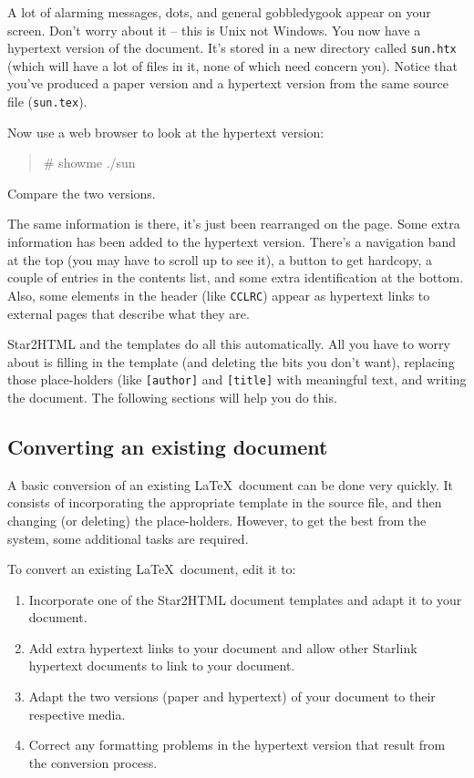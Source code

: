 \documentclass[twoside,11pt,nolof]{starlink}
\begin{document}
A lot of alarming messages, dots, and general gobbledygook appear on your
screen.
Don't worry about it -- this is Unix not Windows.
You now have a hypertext version of the document.
It's stored in a new directory called \texttt{sun.htx} (which will
have a lot of files in it, none of which need concern you).
Notice that you've produced a paper version and a hypertext version from the
same source file (\texttt{sun.tex}).

Now use a web browser to look at the hypertext version:

\begin{quote}
\begin{terminalv}
# showme ./sun
\end{terminalv}
\end{quote}

Compare the two versions.

The same information is there, it's just been rearranged on the page.
Some extra information has been added to the hypertext version.
There's a navigation band at the top (you may have to scroll up to see it), a
button to get hardcopy, a couple of entries in the contents list, and some
extra identification at the bottom.
Also, some elements in the header (like \texttt{CCLRC}) appear as hypertext
links to external pages that describe what they are.

Star2HTML and the templates do all this automatically.
All you have to worry about is filling in the template (and deleting the
bits you don't want), replacing those place-holders (like \texttt{[author]} and
\texttt{[title]} with meaningful text, and writing the document.
The following sections will help you do this.

\subsection{Converting an existing document}

A basic conversion of an existing \LaTeX\ document can be done very quickly.
It consists of incorporating the appropriate template in the source file, and
then changing (or deleting) the place-holders. However, to get the best from
the system, some additional tasks are required.

To convert an existing \LaTeX\ document, edit it to:

\begin{enumerate}
\item Incorporate one of the Star2HTML document templates and adapt it to
 your document.
\item Add extra hypertext links to your document and allow other Starlink
hypertext documents to link to your document.
\item Adapt the two versions (paper and hypertext) of your document to their
 respective media.
\item Correct any formatting problems in the hypertext version that result from
 the conversion process.
\end{enumerate}
\end{document}
